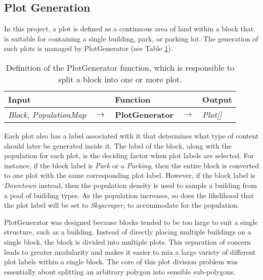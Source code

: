 \subsection{Plot Generation}  

In this project, a plot is defined as a continuous area of land within a block that is suitable for containing a single building, park, or parking lot.
The generation of such plots is managed by PlotGenerator (see Table \ref{table:plotgen}).

\begin{table}[H]
  \centering
  \begin{tabular}{lllll}
    \textbf{Input}                           &               & \textbf{Function}            &               & \textbf{Output}         \\
    \midrule
    \textit{Block, PopulationMap}            & $\rightarrow$ & \textbf{PlotGenerator}       & $\rightarrow$ & \textit{Plot[]}         \\
    \bottomrule
  \end{tabular}

  \caption{Definition of the PlotGenerator function, which is responsible to split a block into one or more plot.}
  \label{table:plotgen}
\end{table}
\vspace{-0.4cm} 

Each plot also has a label associated with it that determines what type of content should later be generated inside it. 
The label of the block, along with the population for each plot, is the deciding factor when plot labels are selected. 
For instance, if the block label is \textit{Park} or a \textit{Parking}, then the entire block is converted to one plot with the same corresponding plot label. 
However, if the block label is \textit{Downtown} instead, then the population density is used to sample a building from a pool of building types. 
As the population increases, so does the likelihood that the plot label will be set to \textit{Skyscraper}, to accommodate for the population. 

PlotGenerator was designed because blocks tended to be too large to suit a single structure, such as a building.
Instead of directly placing multiple buildings on a single block, the block is divided into multiple plots.
This separation of concern leads to greater modularity and makes it easier to mix a large variety of different plot labels within a single block.
The core of this plot division problem was essentially about splitting an arbitrary polygon into sensible sub-polygons. 

